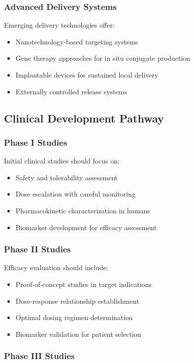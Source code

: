 \documentclass[11pt,a4paper]{article}
\begin{document}
\subsubsection{Advanced Delivery Systems}

Emerging delivery technologies offer:
\begin{itemize}
\item Nanotechnology-based targeting systems
\item Gene therapy approaches for in situ conjugate production
\item Implantable devices for sustained local delivery
\item Externally controlled release systems
\end{itemize}

\subsection{Clinical Development Pathway}

\subsubsection{Phase I Studies}

Initial clinical studies should focus on:
\begin{itemize}
\item Safety and tolerability assessment
\item Dose escalation with careful monitoring
\item Pharmacokinetic characterization in humans
\item Biomarker development for efficacy assessment
\end{itemize}

\subsubsection{Phase II Studies}

Efficacy evaluation should include:
\begin{itemize}
\item Proof-of-concept studies in target indications
\item Dose-response relationship establishment
\item Optimal dosing regimen determination
\item Biomarker validation for patient selection
\end{itemize}

\subsubsection{Phase III Studies}
\end{document}

